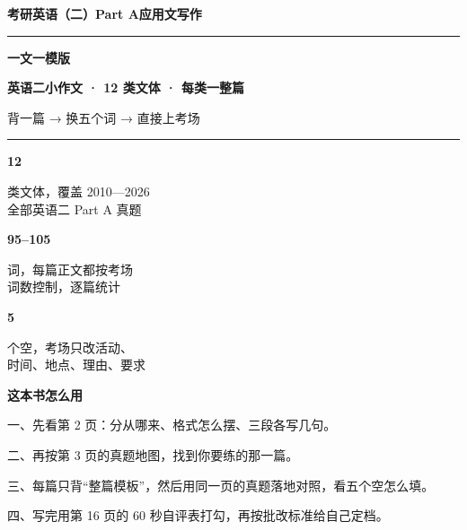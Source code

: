 \documentclass[11pt,a4paper]{ctexart}
\begin{document}
\clearpage
\thispagestyle{empty}
\vspace*{0.55cm}
{\color{accent}\footnotesize\bfseries 考研英语（二）\quad Part A\quad 应用文写作}\par
\vspace{10pt}
{\color{accent}\rule{\linewidth}{2.4pt}}\par
\vspace{14pt}
{\fontsize{40}{44}\selectfont\bfseries 一文一模版}\par
\vspace{8pt}
{\LARGE\bfseries 英语二小作文 · 12 类文体 · 每类一整篇}\par
\vspace{8pt}
{\large\color{gray} 背一篇 → 换五个词 → 直接上考场}\par
\vspace{6pt}
{\color{accent}\rule{\linewidth}{0.9pt}}\par
\vspace{16pt}

\noindent\begin{minipage}[t]{0.32\linewidth}
{\color{accent}\fontsize{30}{32}\selectfont\bfseries 12}\par
{\small\color{gray} 类文体，覆盖 2010—2026\\全部英语二 Part A 真题}
\end{minipage}\hfill
\begin{minipage}[t]{0.32\linewidth}
{\color{accent}\fontsize{30}{32}\selectfont\bfseries 95–105}\par
{\small\color{gray} 词，每篇正文都按考场\\词数控制，逐篇统计}
\end{minipage}\hfill
\begin{minipage}[t]{0.32\linewidth}
{\color{accent}\fontsize{30}{32}\selectfont\bfseries 5}\par
{\small\color{gray} 个空，考场只改活动、\\时间、地点、理由、要求}
\end{minipage}\par

\vspace{22pt}
\noindent\colorbox{soft}{\parbox{\dimexpr\linewidth-2\fboxsep\relax}{%
\vspace{5pt}
{\small\bfseries 这本书怎么用}\par\vspace{3pt}
{\footnotesize
一、先看第 2 页：分从哪来、格式怎么摆、三段各写几句。\par
二、再按第 3 页的真题地图，找到你要练的那一篇。\par
三、每篇只背“整篇模板”，然后用同一页的真题落地对照，看五个空怎么填。\par
四、写完用第 16 页的 60 秒自评表打勾，再按批改标准给自己定档。\par}
\vspace{5pt}}}
\end{document}
